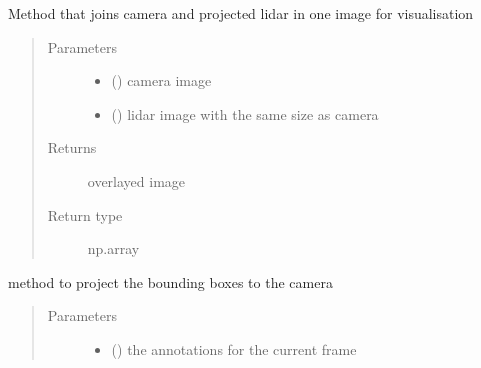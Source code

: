 \documentclass[letterpaper,10pt,english]{sphinxmanual}
\begin{document}
\begin{fulllineitems}
\begin{fulllineitems}
\label{\detokenize{radiate:radiate.Sequence.overlay_camera_lidar}}
Method that joins camera and projected lidar in one image for visualisation
\begin{quote}\begin{description}
\item[{Parameters}] \leavevmode\begin{itemize}
\item {} 
 () \textendash{} camera image

\item {} 
 () \textendash{} lidar image with the same size as camera

\end{itemize}

\item[{Returns}] \leavevmode
overlayed image

\item[{Return type}] \leavevmode
np.array

\end{description}\end{quote}

\end{fulllineitems}


\begin{fulllineitems}
\label{\detokenize{radiate:radiate.Sequence.project_bboxes_to_camera}}
method to project the bounding boxes to the camera
\begin{quote}\begin{description}
\item[{Parameters}] \leavevmode\begin{itemize}
\item {} 
 () \textendash{} the annotations for the current frame


\end{itemize}
\end{description}
\end{quote}
\end{fulllineitems}
\end{fulllineitems}
\end{document}
